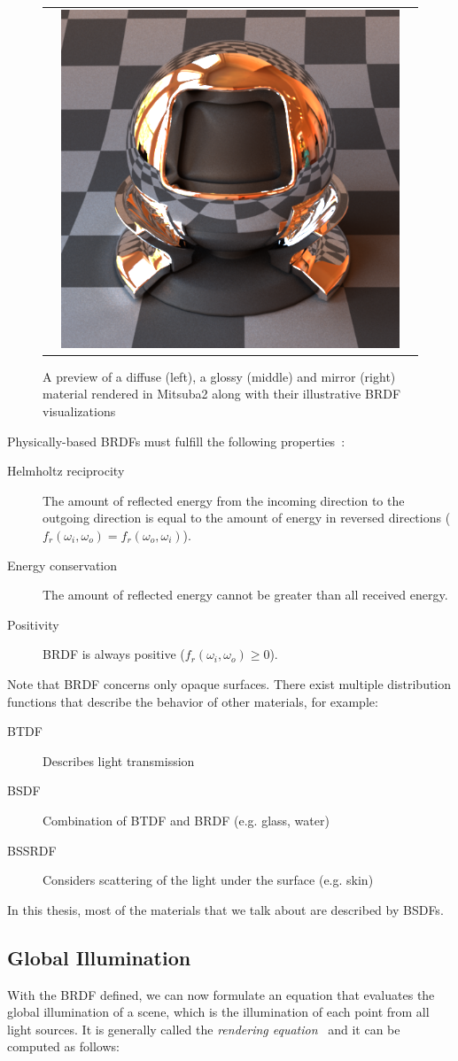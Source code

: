 \begin{figure}[httpb]
\begin{tabular}{ccc}
		&
		\includegraphics[width=.3\linewidth]{img/brdf_mirror.png}
	\end{tabular}
	\caption{A preview of a diffuse (left), a glossy (middle) and mirror (right) material rendered in Mitsuba2 along with their illustrative BRDF visualizations}
	\label{fig:compare_brdf}
\end{figure}


Physically-based BRDFs must fulfill the following properties~\citealp{duvenhage2013numerical}:
\begin{description}
	\item[Helmholtz reciprocity] The amount of reflected energy from the incoming direction to the outgoing direction is equal to the amount of energy in reversed directions ($f_r(\omega_i,\omega_o)=f_r(\omega_o,\omega_i)$).
	\item[Energy conservation] The amount of reflected energy cannot be greater than all received energy.
	\item[Positivity] BRDF is always positive ($f_r(\omega_i,\omega_o)\ge0$).
\end{description}

Note that BRDF concerns only opaque surfaces. There exist multiple distribution functions that describe the behavior of other materials, for example:
\begin{description}
	\item[BTDF] Describes light transmission
	\item[BSDF] Combination of BTDF and BRDF (e.g. glass, water)
	\item[BSSRDF] Considers scattering of the light under the surface (e.g. skin)
\end{description}

In this thesis, most of the materials that we talk about are described by BSDFs.

\subsection{Global Illumination}

With the BRDF defined, we can now formulate an equation that evaluates the global illumination of a scene, which is the illumination of each point from all light sources. It is generally called the \emph{rendering equation}~\cite{kajiya1986rendering} and it can be computed as follows:

